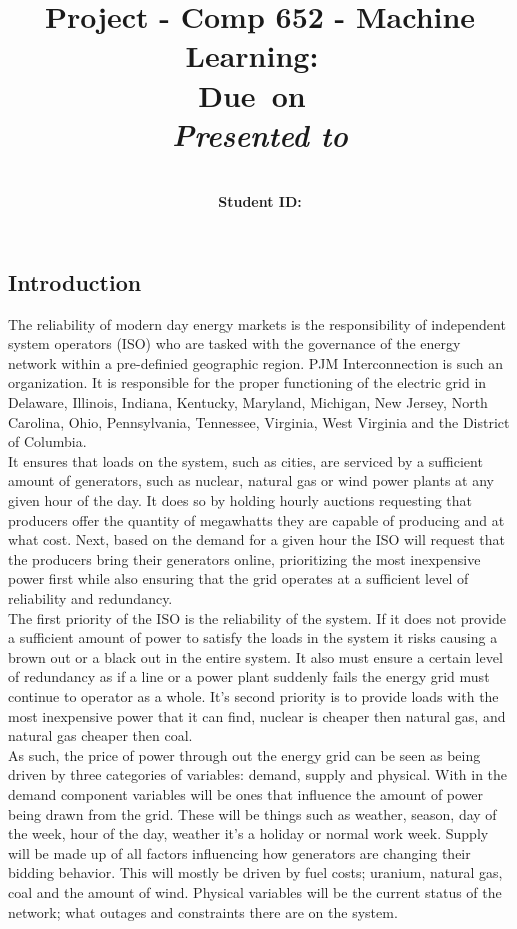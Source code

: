 \documentclass{report}
\title{Project - Comp 652 - Machine Learning}
\title{\vspace{2in}\textmd{\textbf{\hmwkClass:\ \hmwkTitle}}\\
\normalsize\vspace{0.1in}\small{Due\ on\ \hmwkDueDate}\\
\vspace{0.1in}\large{\textit{Presented to \hmwkClassInstructor}}\vspace{3in}}
\date{}
\author{\textbf{\hmwkAuthorName}\\
    \textbf{Student ID: \hmwkAuthorNumber}}
\begin{document}
\maketitle
\subsection*{Introduction}
The reliability of modern day energy markets is the responsibility of
independent system operators (ISO) who are tasked with the governance of the energy
network within a pre-definied geographic region. PJM Interconnection is such an
organization. It is responsible for the proper functioning of the electric grid
in Delaware, Illinois, Indiana, Kentucky, Maryland, Michigan, New Jersey,
North Carolina, Ohio, Pennsylvania, Tennessee, Virginia, West Virginia and the
District of Columbia.\\

It ensures that loads on the system, such as cities, are
serviced by a sufficient amount of generators, such as nuclear, natural gas or
wind power plants at any given hour of the day. It does so by holding hourly
auctions requesting that producers offer the quantity of megawhatts they are capable of
producing and at what cost. Next, based on the demand for a given hour the ISO
will request that the producers bring their generators online, prioritizing the
most inexpensive power first while also ensuring that the grid operates at a
sufficient level of reliability and redundancy.\\

The first priority of the ISO is the reliability of the system. If it does not
provide a sufficient amount of power to satisfy the loads in the system it
risks causing a brown out or a black out in the entire system. It also must
ensure a certain level of redundancy as if a line or a power plant suddenly
fails the energy grid must continue to operator as a whole. It's second
priority is to provide loads with the most inexpensive power that it can find,
nuclear is cheaper then natural gas, and natural gas cheaper then coal.\\

As such, the price of power through out the energy grid can be seen as being driven
by three categories of variables: demand, supply and physical. With in the demand
component variables will be ones that influence the amount of power being drawn from
the grid. These will be things such as weather, season, day of the week, hour of
the day, weather it's a holiday or normal work week. Supply will be made up of all
factors influencing how generators are changing their bidding behavior. This will
mostly be driven by fuel costs; uranium, natural gas, coal and the amount of wind.
Physical variables will be the current status of the network; what outages and
constraints there are on the system.\\
\end{document}
